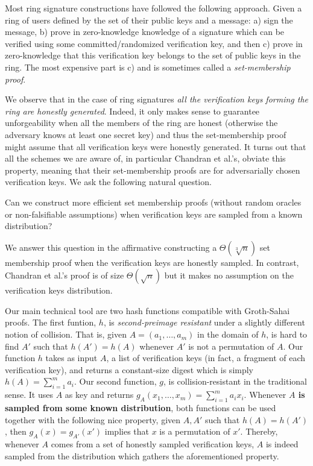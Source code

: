 
Most ring signature constructions have followed the following approach. Given a ring of users defined by the set of their public keys and a message: a) sign the message, b) prove in zero-knowledge knowledge of a signature which can be verified using some committed/randomized verification key, and then c) prove in zero-knowledge that this verification key belongs to the set of public keys in the ring.  The most expensive part is c) and is sometimes called a \emph{set-membership proof}.

We observe that in the case of ring signatures \emph{all the verification keys forming the ring are honestly generated}. 
Indeed, it only makes sense to guarantee unforgeability when all the members of the ring are honest (otherwise the adversary knows at least one secret key) and thus the set-membership proof might assume that all verification keys were honestly generated.
It turns out that all the schemes we are aware of, in particular Chandran et al.'s, obviate this property, meaning that their set-membership proofs are for adversarially chosen verification keys.
We ask the following natural question.
\begin{displayquote}
Can we construct more efficient set membership proofs (without random oracles or non-falsifiable assumptions) when verification keys are sampled from a known distribution?
\end{displayquote}
We answer this question in the affirmative constructing a $\Theta(\sqrt[3]{n})$ set membership proof when the verification keys are honestly sampled. In contrast, Chandran et al.'s proof is of size $\Theta(\sqrt{n})$ but it makes no assumption on the verification keys distribution.

Our main technical tool are two hash functions compatible with Groth-Sahai proofs. The first funtion, $h$, is \emph{second-preimage resistant} under a slightly different notion of collision. That is, given $A=(a_1,\ldots,\allowbreak a_m)$ in the domain of $h$, is hard to find $A'$ such that $h(A')=h(A)$ whenever $A'$ is not a permutation of $A$.
Our function $h$ takes as input $A$, a list of verification keys (in fact, a fragment of each verification key), and returns a constant-size digest which is simply $h(A)= \sum_{i=1}^m a_i$.
Our second function, $g$, is collision-resistant in the traditional sense. It uses $A$ as key and returns $g_A(x_1,\ldots,x_m) = \sum_{i=1}^m a_ix_i$. Whenever {\bf $A$ is sampled from some known distribution}, both functions can be used together with the following nice property, given $A,A'$ such that $h(A)=h(A')$, then $g_A(x)=g_{A'}(x')$ implies that $x$ is a permutation of $x'$. Thereby, whenever $A$ comes from a set of honestly sampled verification keys, $A$ is indeed sampled from the distribution which gathers the aforementioned property. 

